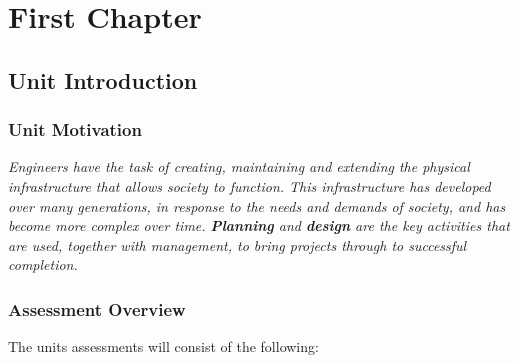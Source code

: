 \documentclass{report}
\begin{document}
	
	\thispagestyle{empty}
	\newpage%
	\tableofcontents
	\chapter{First Chapter}
	
	
	\section{Unit Introduction}
	\subsection{Unit Motivation}
	\textit{Engineers have the task of creating, maintaining and extending the physical infrastructure that allows society to function. This infrastructure has developed over many generations, in response to the needs and demands of society, and has become more complex over time. \textbf{Planning} and \textbf{design} are the key activities that are used, together with management, to bring projects through to successful completion.}
	

	\subsection{Assessment Overview}
	The units assessments will consist of the following:
\end{document}
